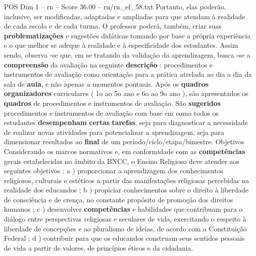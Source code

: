 \begin{textsample}{POS Dim 1 – rn – Score 36.00 – rn/rn\_ef\_58.txt}
Portanto, elas poderão, inclusive, ser modificadas, adaptadas e ampliadas para que atendam à realidade de cada escola e de cada turma.
O professor poderá, também, criar suas \textbf{problematizações} e sugestões didáticas tomando por base a própria experiência e o que melhor se adeque à realidade e à especificidade dos estudantes.
Assim sendo, observa -se que, em se tratando da validação da aprendizagem, busca -se a \textbf{compreensão} da avaliação na seguinte \textbf{descrição} : procedimentos e instrumentos de avaliação como orientação para a prática atrelada ao dia a dia da sala de \textbf{aula}, e não apenas a momentos pontuais.
Após os \textbf{quadros} \textbf{organizadores} curriculares ( 1o ao 5o ano e 6o ao 9o ano ), são apresentados os \textbf{quadros} de procedimentos e instrumentos de avaliação.
São \textbf{sugeridos} procedimentos e instrumentos de avaliação com base em como todos os estudantes \textbf{desempenham} \textbf{certas} \textbf{tarefas}, seja para diagnosticar a necessidade de realizar novas atividades para potencializar a aprendizagem, seja para dimensionar resultados ao \textbf{final} de um período/ciclo/etapa/bimestre.
Objetivos Considerando os marcos normativos e, em conformidade com as \textbf{competências} gerais estabelecidas no âmbito da BNCC, o Ensino Religioso deve atender aos seguintes objetivos : a ) proporcionar a aprendizagem dos conhecimentos religiosos, culturais e estéticos a partir das manifestações religiosas percebidas na realidade dos educandos ; b ) propiciar conhecimentos sobre o direito à liberdade de consciência e de crença, no constante propósito de promoção dos direitos humanos ; c ) desenvolver \textbf{competências} e habilidades que contribuam para o diálogo entre perspectivas religiosas e seculares de vida, exercitando o respeito à liberdade de concepções e ao pluralismo de ideias, de acordo com a Constituição Federal ; d ) contribuir para que os educandos construam seus sentidos pessoais de vida a partir de valores, de princípios éticos e da cidadania.

\end{textsample}
